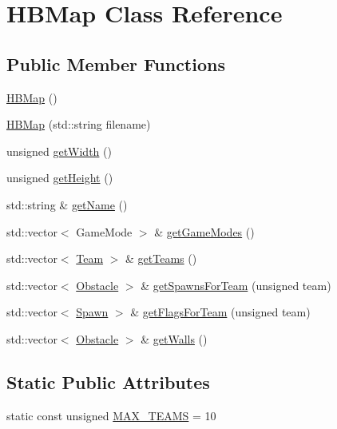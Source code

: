 \hypertarget{class_h_b_map}{\section{H\-B\-Map Class Reference}
\label{class_h_b_map}
}
\subsection*{Public Member Functions}
\begin{DoxyCompactItemize}
\item 
\hyperlink{class_h_b_map_ac67b05db88443e2d7044f134864d2f53}{H\-B\-Map} ()
\item 
\hyperlink{class_h_b_map_a368322ab6cbd98123a00e5df1822d204}{H\-B\-Map} (std\-::string filename)
\item 
unsigned \hyperlink{class_h_b_map_a515e8a0be2e7cce366a81632cce6da4d}{get\-Width} ()
\item 
unsigned \hyperlink{class_h_b_map_a5935af936a849f70c66b0830d517a4c9}{get\-Height} ()
\item 
std\-::string \& \hyperlink{class_h_b_map_a306c703d78a5be354f73186eb9f0cf4c}{get\-Name} ()
\item 
std\-::vector$<$ Game\-Mode $>$ \& \hyperlink{class_h_b_map_a86c9120ba5dea97040c019e99daa0226}{get\-Game\-Modes} ()
\item 
std\-::vector$<$ \hyperlink{struct_team}{Team} $>$ \& \hyperlink{class_h_b_map_a17d50199fdc09f1c8fac6b49d2989cbf}{get\-Teams} ()
\item 
std\-::vector$<$ \hyperlink{class_obstacle}{Obstacle} $>$ \& \hyperlink{class_h_b_map_abf3a3b5a59ba22a08d51ef94cc44794d}{get\-Spawns\-For\-Team} (unsigned team)
\item 
std\-::vector$<$ \hyperlink{class_spawn}{Spawn} $>$ \& \hyperlink{class_h_b_map_a841fd545b388d50df1755f788dee9a03}{get\-Flags\-For\-Team} (unsigned team)
\item 
std\-::vector$<$ \hyperlink{class_obstacle}{Obstacle} $>$ \& \hyperlink{class_h_b_map_adb7096539acd9c192b8291bcea719191}{get\-Walls} ()
\end{DoxyCompactItemize}
\subsection*{Static Public Attributes}
\begin{DoxyCompactItemize}
\item 
static const unsigned \hyperlink{class_h_b_map_a86583aaa4db0d7bac49b94d48cdefc86}{M\-A\-X\-\_\-\-T\-E\-A\-M\-S} = 10
\end{DoxyCompactItemize}


